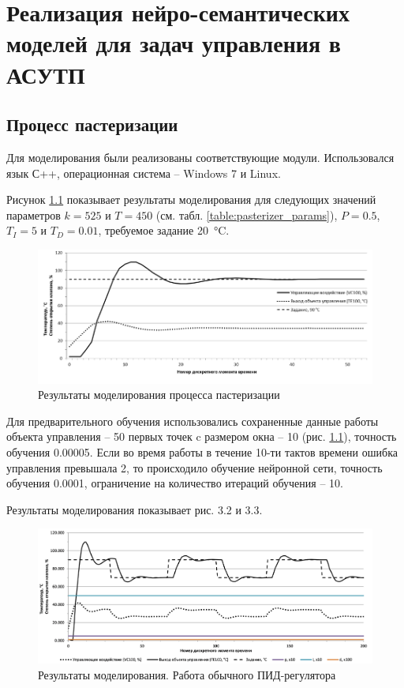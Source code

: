 \chapter{Реализация нейро-семантических моделей для задач управления в АСУТП}

\section{Процесс пастеризации}

Для моделирования были реализованы соответствующие модули. Использовался язык С++, операционная система – Windows 7 и Linux.

Рисунок \ref{fig:Pasteurization_modeling_results} показывает результаты моделирования для следующих значений параметров $k = 525$ и $T = 450$ (см. табл. \ref{table:pasterizer_params}), $P = 0.5$, $T_I = 5$ и $T_D = 0.01$, требуемое задание \SI{20}{\celsius}.

\begin{figure}[H]
    \centering
    \includegraphics[width=\textwidth]{images/chapter_3/Pasteurization_modeling_results.png}
    \caption{Результаты моделирования процесса пастеризации}
    \label{fig:Pasteurization_modeling_results}
\end{figure}

Для предварительного обучения использовались сохраненные данные работы объекта управления – 50 первых точек c размером окна – 10 (рис. \ref{fig:Pasteurization_modeling_results}), точность обучения 0.00005. Если во время работы в течение 10-ти тактов времени ошибка управления превышала 2, то происходило обучение нейронной сети, точность обучения 0.0001, ограничение на количество итераций обучения – 10.

Результаты моделирования показывает рис. 3.2 и 3.3.

\begin{figure}[H]
    \centering
    \includegraphics[width=\textwidth]{images/chapter_3/Pasteurization_modeling_results_with_typical_PID.png}
    \caption{Результаты моделирования. Работа обычного ПИД-регулятора}
    \label{fig:Pasteurization_modeling_results_with_typical_PID}
\end{figure}

